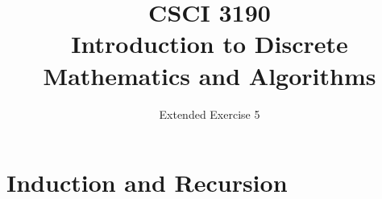 \documentclass{../../cls/sig-alternate-05-2015}
\begin{document}






%

\title{CSCI 3190 \\ Introduction to Discrete Mathematics and Algorithms}
\subtitle{Extended Exercise 5}

\maketitle
\begin{abstract}

\end{abstract}

\keywords{}

\section{Induction and Recursion}
\end{document}
